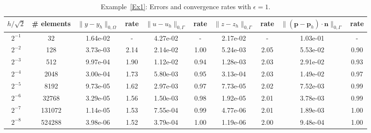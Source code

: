 \documentclass[a4paper,10pt]{article}
\newcommand{\bp}{{\mathbf{p}}}
\numberwithin{theorem}{section}
\begin{document}
\begin{table}[H]
\centering
\caption{Example~\ref{Ex1}: Errors and convergence rates with $\epsilon=1$.}
\resizebox{\textwidth}{!}
{%
\begin{tabular}{c|c | c c | c c | c c | c c}
$h/\sqrt{2}$
&\# elements 
& $\|y-y_h\|_{0,\Omega}$ & rate
& $\|u-u_h\|_{0,\Gamma}$ & rate
& $\|z-z_h\|_{0,\Gamma}$ & rate
& $\|(\bp-\bp_h)\cdot \mathbf n\|_{0,\Gamma}$ & rate \\
\hline
$2^{-1}$ & 32     & 1.64e-02 &  -   & 4.27e-02 &  -   & 2.17e-02 &  -   & 1.03e-01 &  -   \\
$2^{-2}$ & 128    & 3.73e-03 & 2.14 & 2.14e-02 & 1.00 & 5.24e-03 & 2.05 & 5.53e-02 & 0.90 \\
$2^{-3}$ & 512    & 9.97e-04 & 1.90 & 1.12e-02 & 0.94 & 1.28e-03 & 2.03 & 2.91e-02 & 0.93 \\
$2^{-4}$ & 2048   & 3.00e-04 & 1.73 & 5.80e-03 & 0.95 & 3.13e-04 & 2.03 & 1.49e-02 & 0.97 \\
$2^{-5}$ & 8192   & 9.73e-05 & 1.62 & 2.97e-03 & 0.97 & 7.73e-05 & 2.02 & 7.52e-03 & 0.99 \\
$2^{-6}$ & 32768  & 3.29e-05 & 1.56 & 1.50e-03 & 0.98 & 1.92e-05 & 2.01 & 3.78e-03 & 0.99 \\
$2^{-7}$ & 131072 & 1.14e-05 & 1.53 & 7.55e-04 & 0.99 & 4.77e-06 & 2.01 & 1.89e-03 & 1.00 \\
$2^{-8}$ & 524288 & 3.98e-06 & 1.52 & 3.79e-04 & 1.00 & 1.19e-06 & 2.00 & 9.48e-04 & 1.00 \\
\hline
\end{tabular}
}
\label{Ex1_combined_table_eps0}
\end{table}
\end{document}
